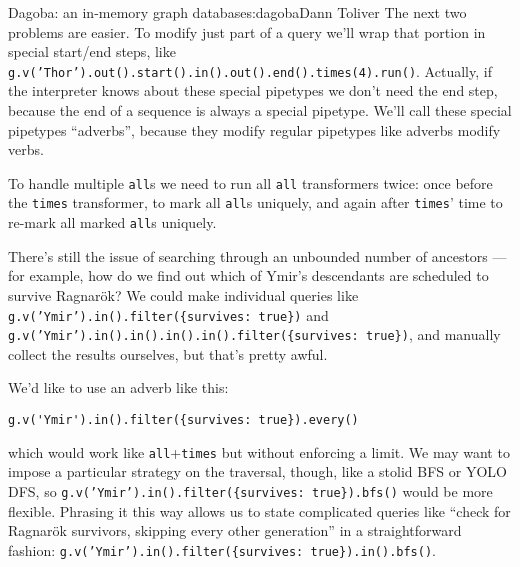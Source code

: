 \begin{aosachapter}{Dagoba: an in-memory graph database}{s:dagoba}{Dann Toliver}
The next two problems are easier. To modify just part of a query we'll
wrap that portion in special start/end steps, like
\texttt{g.v('Thor').out().start().in().out().end().times(4).run()}.
Actually, if the interpreter knows about these special pipetypes we
don't need the end step, because the end of a sequence is always a
special pipetype. We'll call these special pipetypes ``adverbs'',
because they modify regular pipetypes like adverbs modify verbs.

To handle multiple \texttt{all}s we need to run all \texttt{all}
transformers twice: once before the \texttt{times} transformer, to mark
all \texttt{all}s uniquely, and again after \texttt{times}' time to
re-mark all marked \texttt{all}s uniquely.

There's still the issue of searching through an unbounded number of
ancestors --- for example, how do we find out which of Ymir's
descendants are scheduled to survive Ragnarök? We could make individual
queries like \texttt{g.v('Ymir').in().filter(\{survives: true\})} and
\newline \texttt{g.v('Ymir').in().in().in().in().filter(\{survives: true\})},
and manually collect the results ourselves, but that's pretty awful.

We'd like to use an adverb like this:

\begin{verbatim}
g.v('Ymir').in().filter({survives: true}).every()
\end{verbatim}

which would work like \texttt{all}+\texttt{times} but without enforcing
a limit. We may want to impose a particular strategy on the traversal,
though, like a stolid BFS or YOLO DFS, so
\newline \texttt{g.v('Ymir').in().filter(\{survives: true\}).bfs()}
would be more flexible. Phrasing it this way allows us to state
complicated queries like ``check for Ragnarök survivors, skipping every
other generation'' in a straightforward fashion:
\texttt{g.v('Ymir').in().filter(\{survives: true\}).in().bfs()}.

\label{wrapping-up}


\end{aosachapter}
